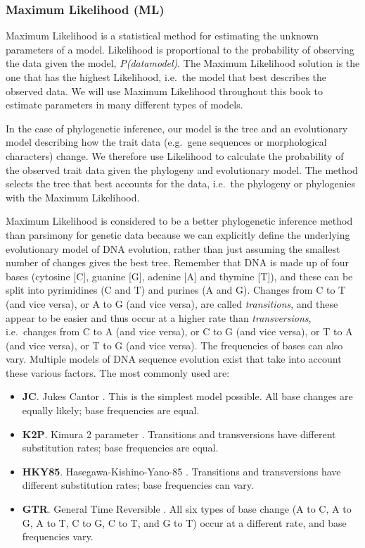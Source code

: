 \documentclass[]{book}
\providecommand{\tightlist}{%
  \setlength{\itemsep}{0pt}\setlength{\parskip}{0pt}}
\begin{document}
\subsubsection{Maximum Likelihood (ML)}\label{maximum-likelihood-ml}

Maximum Likelihood is a statistical method for estimating the unknown
parameters of a model. Likelihood is proportional to the probability of
observing the data given the model, \emph{P(data\textbar{}model)}. The
Maximum Likelihood solution is the one that has the highest Likelihood,
i.e.~the model that best describes the observed data. We will use
Maximum Likelihood throughout this book to estimate parameters in many
different types of models.

In the case of phylogenetic inference, our model is the tree and an
evolutionary model describing how the trait data (e.g.~gene sequences or
morphological characters) change. We therefore use Likelihood to
calculate the probability of the observed trait data given the phylogeny
and evolutionary model. The method selects the tree that best accounts
for the data, i.e.~the phylogeny or phylogenies with the Maximum
Likelihood.

Maximum Likelihood is considered to be a better phylogenetic inference
method than parsimony for genetic data because we can explicitly define
the underlying evolutionary model of DNA evolution, rather than just
assuming the smallest number of changes gives the best tree. Remember
that DNA is made up of four bases (cytosine {[}C{]}, guanine {[}G{]},
adenine {[}A{]} and thymine {[}T{]}), and these can be split into
pyrimidines (C and T) and purines (A and G). Changes from C to T (and
vice versa), or A to G (and vice versa), are called \emph{transitions},
and these appear to be easier and thus occur at a higher rate than
\emph{transversions}, i.e.~changes from C to A (and vice versa), or C to
G (and vice versa), or T to A (and vice versa), or T to G (and vice
versa). The frequencies of bases can also vary. Multiple models of DNA
sequence evolution exist that take into account these various factors.
The most commonly used are:

\begin{itemize}
\tightlist
\item
  \textbf{JC}. Jukes Cantor \citep{jukes1969evolution}. This is the
  simplest model possible. All base changes are equally likely; base
  frequencies are equal.
\item
  \textbf{K2P}. Kimura 2 parameter \citep{kimura1980simple}. Transitions
  and transversions have different substitution rates; base frequencies
  are equal.
\item
  \textbf{HKY85}. Hasegawa-Kishino-Yano-85 \citep{hasegawa1985dating}.
  Transitions and transversions have different substitution rates; base
  frequencies can vary.
\item
  \textbf{GTR}. General Time Reversible \citep{lanave1984new}. All six
  types of base change (A to C, A to G, A to T, C to G, C to T, and G to
  T) occur at a different rate, and base frequencies vary.
\end{itemize}
\end{document}
